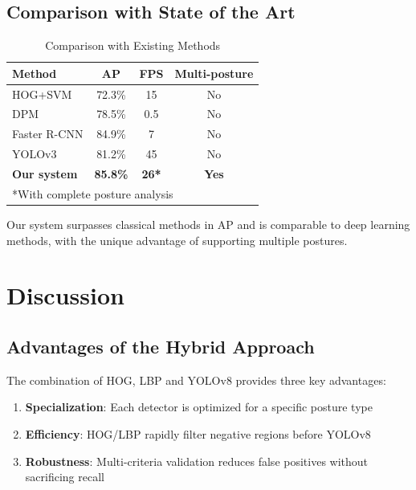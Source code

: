 \documentclass[conference]{IEEEtran}
\begin{document}
\subsection{Comparison with State of the Art}

\begin{table}[htbp]
\caption{Comparison with Existing Methods}
\begin{center}
\begin{tabular}{|l|c|c|c|}
\hline
\textbf{Method} & \textbf{AP} & \textbf{FPS} & \textbf{Multi-posture} \\
\hline
HOG+SVM \cite{dalal2005histograms} & 72.3\% & 15 & No \\
DPM \cite{felzenszwalb2009object} & 78.5\% & 0.5 & No \\
Faster R-CNN \cite{ren2015faster} & 84.9\% & 7 & No \\
YOLOv3 \cite{redmon2018yolov3} & 81.2\% & 45 & No \\
\hline
\textbf{Our system} & \textbf{85.8\%} & \textbf{26*} & \textbf{Yes} \\
\hline
\multicolumn{4}{l}{*With complete posture analysis} \\
\end{tabular}
\label{tab:comparison}
\end{center}
\end{table}

Our system surpasses classical methods in AP and is comparable to deep learning methods, with the unique advantage of supporting multiple postures.

\section{Discussion}

\subsection{Advantages of the Hybrid Approach}

The combination of HOG, LBP and YOLOv8 provides three key advantages:

\begin{enumerate}
    \item \textbf{Specialization}: Each detector is optimized for a specific posture type
    \item \textbf{Efficiency}: HOG/LBP rapidly filter negative regions before YOLOv8
    \item \textbf{Robustness}: Multi-criteria validation reduces false positives without sacrificing recall
\end{enumerate}
\end{document}
